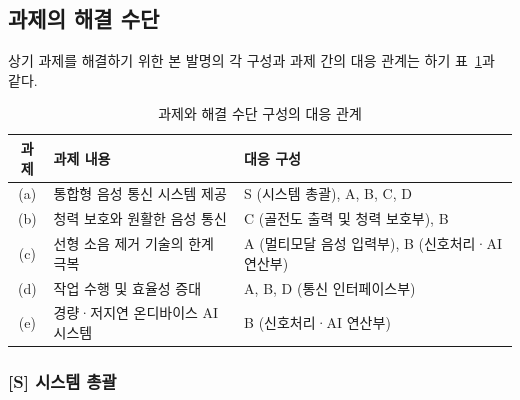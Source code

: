\documentclass{article}
\begin{document}
\subsection{과제의 해결 수단}


상기 과제를 해결하기 위한 본 발명의 각 구성과 과제 간의 대응 관계는 하기 표~\ref{tab:task_solution_map}과 같다.

\begin{table}[!h]
    \centering
    \renewcommand{\arraystretch}{1.3}
    \begin{tabular}{c|l|l}
        \hline
        \textbf{과제} & \textbf{과제 내용} & \textbf{대응 구성} \\
        \hline\hline
        (a) & 통합형 음성 통신 시스템 제공 & S (시스템 총괄), A, B, C, D \\
        \hline
        (b) & 청력 보호와 원활한 음성 통신 & C (골전도 출력 및 청력 보호부), B \\
        \hline
        (c) & 선형 소음 제거 기술의 한계 극복 & A (멀티모달 음성 입력부), B (신호처리·AI 연산부) \\
        \hline
        (d) & 작업 수행 및 효율성 증대 & A, B, D (통신 인터페이스부) \\
        \hline
        (e) & 경량·저지연 온디바이스 AI 시스템 & B (신호처리·AI 연산부) \\
        \hline
    \end{tabular}
    \caption{과제와 해결 수단 구성의 대응 관계}
    \label{tab:task_solution_map}
\end{table}


\subsubsection{[S] 시스템 총괄}
\end{document}
